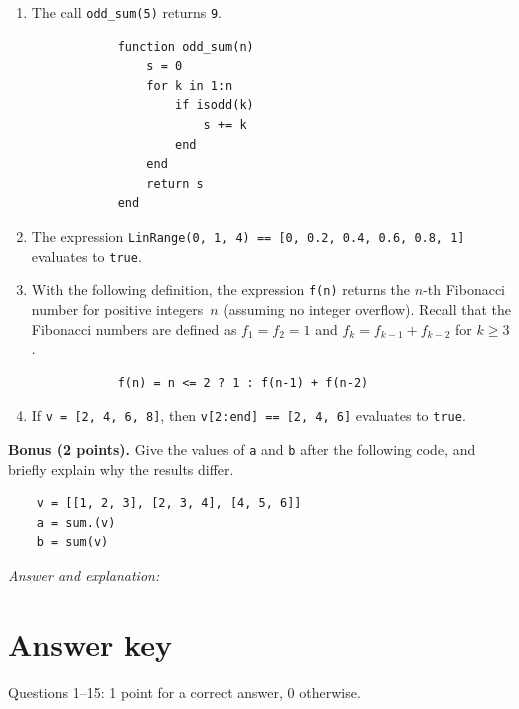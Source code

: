 \documentclass[a4paper]{article}
\newcommand{\julia}[1]{\texttt{#1}}
\begin{document}
\newpage
\begin{enumerate}[resume,itemsep=8pt]
    \item
        The call \julia{odd_sum(5)} returns \julia{9}.
        \begin{verbatim}
            function odd_sum(n)
                s = 0
                for k in 1:n
                    if isodd(k)
                        s += k
                    end
                end
                return s
            end
        \end{verbatim}

    \item
        The expression \julia{LinRange(0, 1, 4) == [0, 0.2, 0.4, 0.6, 0.8, 1]}
        evaluates to \julia{true}.

    \item
        With the following definition, the expression \julia{f(n)} returns
        the $n$-th Fibonacci number for positive integers~$n$
        (assuming no integer overflow).
        Recall that the Fibonacci numbers are defined as
        $f_1=f_2=1$ and $f_k=f_{k-1}+f_{k-2}$ for $k\geq3$.
        \begin{verbatim}
            f(n) = n <= 2 ? 1 : f(n-1) + f(n-2)
        \end{verbatim}

    \item
        If \julia{v = [2, 4, 6, 8]}, then \julia{v[2:end] == [2, 4, 6]} evaluates to \julia{true}.
\end{enumerate}

\noindent\textbf{Bonus (2 points).}
Give the values of \julia{a} and \julia{b} after the following code,
and briefly explain why the results differ.
\begin{verbatim}
    v = [[1, 2, 3], [2, 3, 4], [4, 5, 6]]
    a = sum.(v)
    b = sum(v)
\end{verbatim}
\noindent\textit{Answer and explanation:}
\vspace{2cm}

\ifdefined\showsolutions
\newpage
{}
\section*{Answer key}
\noindent Questions 1--15: 1 point for a correct answer, 0 otherwise.
\end{document}
